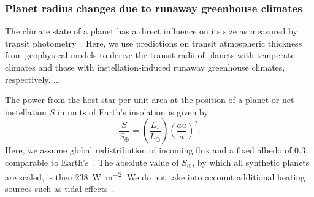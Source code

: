 \documentclass[modern]{aastex631}
\begin{document}
\subsubsection{Planet radius changes due to runaway greenhouse climates}\label{sec:mo_model}
The climate state of a planet has a direct influence on its size as measured by transit photometry~\citep{Turbet2019}.
Here, we use predictions on transit atmospheric thickness from geophysical models to derive the transit radii of planets with temperate climates and those with instellation-induced runaway greenhouse climates, respectively.
...

\begin{note}
    The power from the host star per unit area at the position of a planet or net instellation $S$ in units of Earth's insolation is given by
    \begin{equation}
        \frac{S}{S_\oplus} = \left(\frac{L_\star}{L_\odot}\right) \left(\frac{au}{a}\right)^2 .
    \end{equation}
    Here, we assume global redistribution of incoming flux and a fixed albedo of $0.3$, comparable to Earth's~\citep{Haar1971}.
    The absolute value of $S_\oplus$, by which all synthetic planets are scaled, is then \SI{238}{\watt\per\square\meter}.
   We do not take into account additional heating sources such as tidal effects~\citep[e.g.][]{Barnes2013}.
\end{note}
\end{document}

